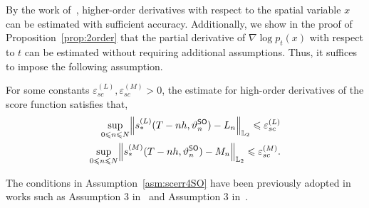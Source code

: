 \documentclass[11pt]{article}
\def\Ltwo{\mathbb L_2}
\def\l|{\left\lVert}
\def\r|{\right\rVert}
\begin{document}
By the work of~\cite{meng2021highorder}, higher-order derivatives with respect to the spatial variable $x$ can be estimated with sufficient accuracy.
Additionally, we show in the proof of Proposition~\ref{prop:2order} that the partial derivative of $\nabla\log p_t(x)$ with respect to $t$ can be estimated without requiring additional assumptions. 
Thus, it suffices to impose the following assumption.
\begin{assumption}
\label{asm:scerr4SO}
    For some constants $\varepsilon_{sc}^{(L)},\varepsilon_{sc}^{(M)}>0$, the estimate for high-order derivatives of the score function satisfies that,
    \begin{align*}
        \sup_{0\leqslant n\leqslant N}\l|s_*^{(L)}(T-nh,\vartheta_n^{\sf SO})-L_n\r|_{\Ltwo}\leqslant \varepsilon_{sc}^{(L)}\\
        \sup_{0\leqslant n\leqslant N}\l|s_*^{(M)}(T-nh,\vartheta_n^{\sf SO})-M_n\r|_{\Ltwo}\leqslant \varepsilon_{sc}^{(M)}.
    \end{align*}
\end{assumption}
The conditions in Assumption~\ref{asm:scerr4SO} have been previously adopted in works such as Assumption 3 in~\cite{liang2024broadening} and Assumption 3 in~\cite{li2024accelerating}.
\end{document}
